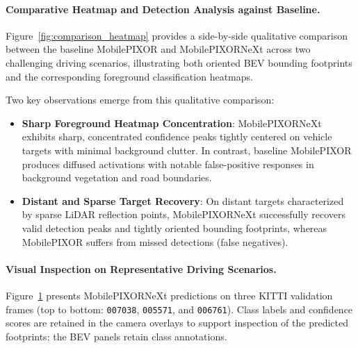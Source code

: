 \paragraph{Comparative Heatmap and Detection Analysis against Baseline.}
Figure~\ref{fig:comparison_heatmap} provides a side-by-side qualitative comparison between the baseline MobilePIXOR and MobilePIXORNeXt across two challenging driving scenarios, illustrating both oriented BEV bounding footprints and the corresponding foreground classification heatmaps.

Two key observations emerge from this qualitative comparison:
\begin{itemize}
    \item \textbf{Sharp Foreground Heatmap Concentration}: MobilePIXORNeXt exhibits sharp, concentrated confidence peaks tightly centered on vehicle targets with minimal background clutter. In contrast, baseline MobilePIXOR produces diffused activations with notable false-positive responses in background vegetation and road boundaries.
    \item \textbf{Distant and Sparse Target Recovery}: On distant targets characterized by sparse LiDAR reflection points, MobilePIXORNeXt successfully recovers valid detection peaks and tightly oriented bounding footprints, whereas MobilePIXOR suffers from missed detections (false negatives).
\end{itemize}

\paragraph{Visual Inspection on Representative Driving Scenarios.}
Figure~\ref{fig:qualitative_detections} presents MobilePIXORNeXt predictions on three KITTI validation frames (top to bottom: \texttt{007038}, \texttt{005571}, and \texttt{006761}). Class labels and confidence scores are retained in the camera overlays to support inspection of the predicted footprints; the BEV panels retain class annotations.

\begin{figure}[!t]
\centering
{}
\label{fig:qualitative_detections}
\end{figure}

